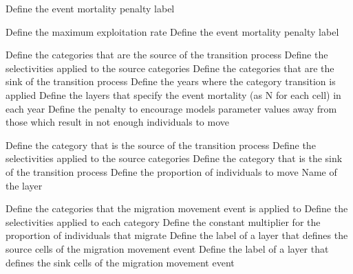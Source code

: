  {Define the event mortality penalty label}
\par\textbf{}\par
{}
 {Define the maximum exploitation rate}
 {Define the event mortality penalty label}
\par\textbf{}\par
{} {Define the categories that are the source of the transition process}
 {Define the selectivities applied to the source categories}
 {Define the categories that are the sink of the transition process}
 {Define the years where the category transition is applied}
 {Define the layers that specify the event mortality (as N for each cell) in each year}
 {Define the penalty to encourage models parameter values away from those which result in not enough individuals to move}
\par\textbf{}\par
{} {Define the category that is the source of the transition process}
 {Define the selectivities applied to the source categories}
 {Define the category that is the sink of the transition process}
 {Define the proportion of individuals to move}
 {Name of the layer}
\par\textbf{}\par
{} {Define the categories that the migration movement event is applied to}
 {Define the selectivities applied to each category}
 {Define the constant multiplier for the proportion of individuals that migrate}
 {Define the label of a layer that defines the source cells of the migration movement event}
 {Define the label of a layer that defines the sink cells of the migration movement event}
